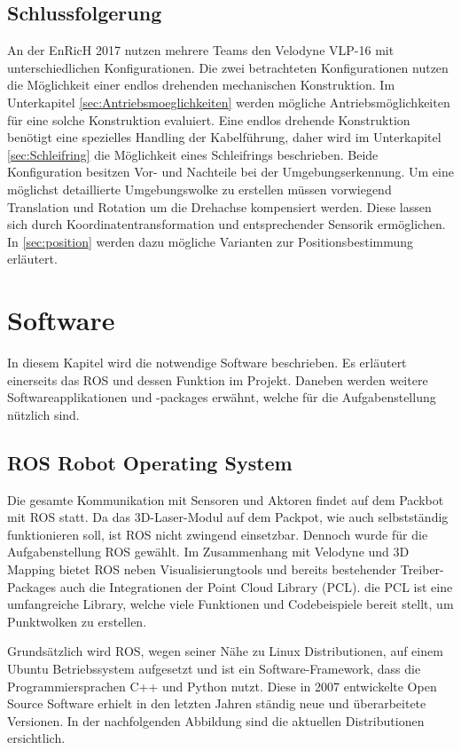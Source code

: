 \subsection{Schlussfolgerung}
An der \ac{EnRicH} 2017 nutzen mehrere Teams den Velodyne VLP-16 mit unterschiedlichen Konfigurationen. Die zwei betrachteten Konfigurationen nutzen die Möglichkeit einer endlos drehenden mechanischen Konstruktion. Im Unterkapitel \ref{sec:Antriebsmoeglichkeiten} werden mögliche Antriebsmöglichkeiten für eine solche Konstruktion evaluiert. Eine endlos drehende Konstruktion benötigt eine spezielles Handling der Kabelführung, daher wird im Unterkapitel \ref{sec:Schleifring} die Möglichkeit eines Schleifrings beschrieben. Beide Konfiguration besitzen Vor- und Nachteile bei der Umgebungserkennung. Um eine möglichst detaillierte Umgebungswolke zu erstellen müssen vorwiegend Translation und Rotation um die Drehachse kompensiert werden. Diese lassen sich durch Koordinatentransformation und entsprechender Sensorik ermöglichen. In \ref{sec:position} werden dazu mögliche Varianten zur Positionsbestimmung erläutert.
  

\section{Software}
\label{sec:Software}
In diesem Kapitel wird die notwendige Software beschrieben. Es erläutert einerseits das \ac{ROS} und dessen Funktion im Projekt. Daneben werden weitere Softwareapplikationen und -packages erwähnt, welche für die Aufgabenstellung nützlich sind.

\subsection{ROS Robot Operating System}
\label{subsec:ROS}
Die gesamte Kommunikation mit Sensoren und Aktoren findet auf dem Packbot mit \ac{ROS} statt. Da das 3D-Laser-Modul auf dem Packpot, wie auch selbstständig funktionieren soll, ist ROS nicht zwingend einsetzbar. Dennoch wurde für die Aufgabenstellung ROS gewählt. Im Zusammenhang mit Velodyne und 3D Mapping bietet ROS neben Visualisierungtools und bereits bestehender Treiber-Packages auch die Integrationen der Point Cloud Library (PCL). die PCL ist eine umfangreiche Library, welche viele Funktionen und Codebeispiele bereit stellt, um Punktwolken zu erstellen.

Grundsätzlich wird \ac{ROS}, wegen seiner Nähe zu Linux Distributionen, auf einem Ubuntu Betriebssystem aufgesetzt und ist ein Software-Framework, dass die Programmiersprachen C++ und Python nutzt. Diese in 2007 entwickelte Open Source Software erhielt in den letzten Jahren ständig neue und überarbeitete Versionen. In der nachfolgenden Abbildung sind die aktuellen Distributionen ersichtlich.

